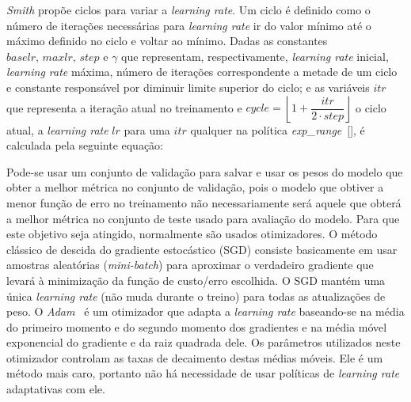 \textit{Smith} propõe ciclos para variar a \textit{learning rate}. Um ciclo é definido como o número de iterações necessárias para \textit{learning rate} ir do valor mínimo até o máximo definido no ciclo e voltar ao mínimo. Dadas as constantes $baselr,\, maxlr,\, step \text{ e } \gamma$ que representam, respectivamente, \textit{learning rate} inicial, \textit{learning rate} máxima, número de iterações correspondente a metade de um ciclo e constante responsável por diminuir limite superior do ciclo; e as variáveis $itr$ que representa a iteração atual no treinamento e $cycle = \left\lfloor1 + \dfrac{itr}{2 \cdot step}\right\rfloor$ o ciclo atual, a \textit{learning rate} $lr$ para uma $itr$ qualquer na política \textit{exp\_range}~[], é calculada pela seguinte equação:

Pode-se usar um conjunto de validação para salvar e usar os pesos do modelo que obter a melhor métrica no conjunto de validação, pois o modelo que obtiver a menor função de erro no treinamento não necessariamente será aquele que obterá a melhor métrica no conjunto de teste usado para avaliação do modelo. Para que este objetivo seja atingido, normalmente são usados otimizadores. O método clássico de descida do gradiente estocástico (\acrshort{SGD}) consiste basicamente em usar amostras aleatórias (\textit{mini-batch}) para aproximar o verdadeiro gradiente que levará à minimização da função de custo/erro escolhida. O \acrshort{SGD} mantém uma única \textit{learning rate} (não muda durante o treino) para todas as atualizações de peso. O \textit{Adam}~\cite{kingma2014adam} é um otimizador que adapta a \textit{learning rate} baseando-se na média do primeiro momento e do segundo momento dos gradientes e na média móvel exponencial do gradiente e da raiz quadrada dele. Os parâmetros utilizados neste otimizador controlam as taxas de decaimento destas médias móveis. Ele é um método mais caro, portanto não há necessidade de usar políticas de \textit{learning rate} adaptativas com ele.
